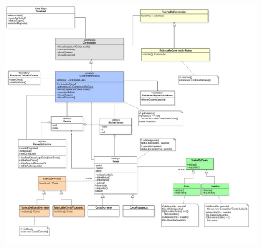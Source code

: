 \documentclass[12pt]{exam}
\begin{document}
\begin{questions}
\begin{solution}
        \includegraphics[width=0.82\textwidth]{imagens/lista2e4.jpg}
      \end{solution}
	
  \end{questions}
\end{document}
